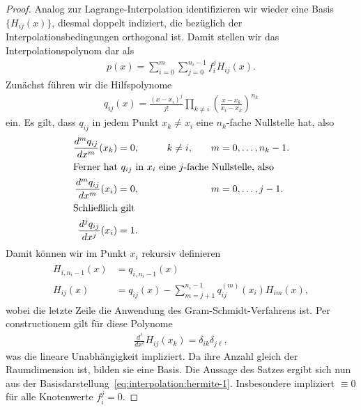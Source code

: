 \begin{proof}
  Analog zur Lagrange-Interpolation identifizieren wir wieder eine
  Basis $\{H_{ij}(x)\}$, diesmal doppelt indiziert, die bezüglich der
  Interpolationsbedingungen orthogonal ist. Damit stellen wir das
  Interpolationspolynom dar als
  \begin{gather}
    \label{eq:interpolation:hermite-1}
    p(x) = \sum_{i=0}^m \sum_{j=0}^{n_i-1} f_i^j H_{ij}(x).
  \end{gather}
  Zunächst führen wir die Hilfspolynome
  \begin{gather}
    q_{ij}(x) = \frac{(x-x_i)^j}{j!}\prod_{k\neq i}
    \left(\frac{x-x_k}{x_i-x_k}\right)^{n_k}
  \end{gather}
  ein. Es gilt, dass $q_{ij}$ in jedem Punkt $x_k \neq x_i$ eine $n_k$-fache Nullstelle hat, also
  \begin{gather}
    \begin{aligned}
      \frac{d^m q_{ij}}{d x^m} (x_k) &=0,
      \quad &k\neq i,&\quad& m&=0,\dots,n_{k}-1.\\
      \intertext{Ferner hat $q_{ij}$ in $x_i$ eine $j$-fache Nullstelle, also}
      \frac{d^m q_{ij}}{d x^m} (x_i) &=0,
      \qquad &&& m&=0,\dots,j-1.\\
      \intertext{Schließlich gilt}
      \frac{d^j q_{ij}}{d x^j} (x_i) &=1.
    \end{aligned}
  \end{gather}
  Damit können wir im Punkt $x_i$ rekursiv definieren
  \begin{gather}
    \begin{aligned}
      H_{i,n_i-1}(x) &= q_{i,n_i-1}(x)\\
      H_{ij}(x) &= q_{ij}(x) - \sum_{m=j+1}^{n_i-1} q_{ij}^{(m)}(x_i) H_{im}(x),
    \end{aligned}
  \end{gather}
  wobei die letzte Zeile die Anwendung des Gram-Schmidt-Verfahrens
  ist. Per constructionem gilt für diese Polynome
  \begin{gather}
    \frac{d^\ell}{dx^\ell} H_{ij}(x_k) = \delta_{ik}\delta_{j\ell},
  \end{gather}
  was die lineare Unabhängigkeit impliziert. Da ihre Anzahl gleich der
  Raumdimension ist, bilden sie eine Basis. Die Aussage des Satzes
  ergibt sich nun aus der
  Basisdarstellung~\eqref{eq:interpolation:hermite-1}. Insbesondere
  impliziert $\equiv 0$ für alle Knotenwerte $f_i^j=0$.
\end{proof}

